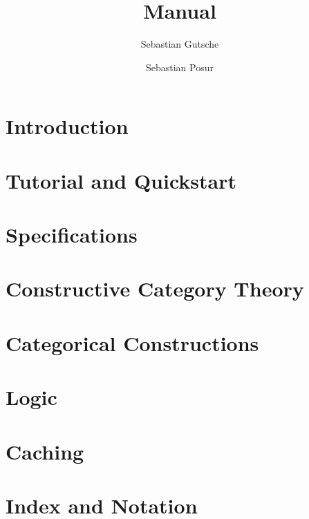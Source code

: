 \documentclass[12pt,a4paper]{amsbook}
\author{Sebastian Gutsche}
\author{Sebastian Posur}
\begin{document}
\title[Cap Manual]{\CapPkg Manual}

\maketitle

\tableofcontents

\chapter{Introduction}
  
  
\chapter{Tutorial and Quickstart}
  

\chapter{Specifications}\label{chapter:specifications}
  

\chapter{Constructive Category Theory}
  

\chapter{Categorical Constructions}\label{chapter:constructions}
  

\chapter{Logic}
  

\chapter{Caching}\label{chapter:caching}
  

\chapter{Index and Notation}
  





\end{document}
